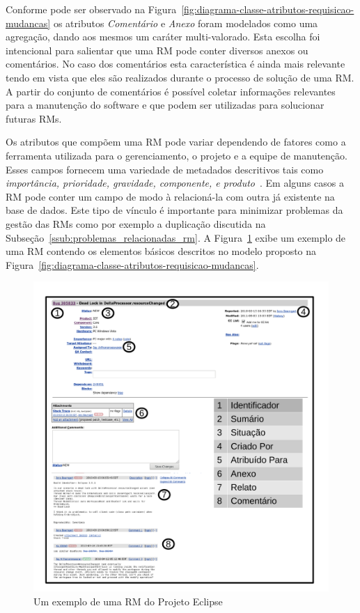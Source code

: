 Conforme pode ser observado na
Figura~\ref{fig:diagrama-classe-atributos-requisicao-mudancas} os atributos
\textit{Comentário} e \textit{Anexo} foram modelados como uma agregação, dando
aos mesmos um caráter multi-valorado. Esta escolha foi intencional para salientar
que uma RM pode conter diversos anexos ou comentários. No caso dos comentários
esta característica é ainda mais relevante tendo em vista que eles são
realizados durante o processo de solução de uma RM\@. A partir do conjunto de
comentários é possível coletar informações relevantes para a manutenção do
software e que podem ser utilizadas para solucionar futuras RMs.

Os atributos que compõem uma RM pode variar dependendo de fatores como a
ferramenta utilizada para o gerenciamento, o projeto e a equipe de manutenção.
Esses campos fornecem uma variedade de metadados descritivos tais como
\textit{importância, prioridade, gravidade, componente, e
    produto}~\cite{zhang2016literature}. Em alguns casos a RM pode conter um
campo de modo à relacioná-la com outra já existente na base de dados. Este tipo
de vínculo é importante para minimizar problemas da gestão das RMs como por
exemplo a duplicação discutida na Subseção~\ref{ssub:problemas_relacionadas_rm}.
A Figura~\ref{fig:rm-exemplo} exibe um exemplo de uma RM contendo os elementos
básicos descritos no modelo proposto na
Figura~\ref{fig:diagrama-classe-atributos-requisicao-mudancas}.

\begin{figure}[htpb]
	\centering
	\includegraphics[width=0.8\linewidth]{./chapter-manutencao-software-visao-geral/img/rm-exemplo.pdf}
	\caption{Um exemplo de uma RM do Projeto Eclipse}
\label{fig:rm-exemplo}
\end{figure}


